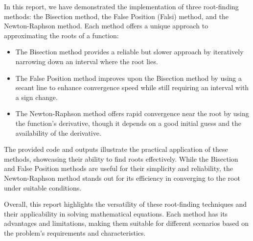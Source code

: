 \documentclass{scrreprt}
\begin{document}
In this report, we have demonstrated the implementation of three root-finding methods: the Bisection method, the False Position (Falsi) method, and the Newton-Raphson method. Each method offers a unique approach to approximating the roots of a function:

\begin{itemize}
    \item The Bisection method provides a reliable but slower approach by iteratively narrowing down an interval where the root lies.
    \item The False Position method improves upon the Bisection method by using a secant line to enhance convergence speed while still requiring an interval with a sign change.
    \item The Newton-Raphson method offers rapid convergence near the root by using the function's derivative, though it depends on a good initial guess and the availability of the derivative.
\end{itemize}

The provided code and outputs illustrate the practical application of these methods, showcasing their ability to find roots effectively. While the Bisection and False Position methods are useful for their simplicity and reliability, the Newton-Raphson method stands out for its efficiency in converging to the root under suitable conditions.

Overall, this report highlights the versatility of these root-finding techniques and their applicability in solving mathematical equations. Each method has its advantages and limitations, making them suitable for different scenarios based on the problem's requirements and characteristics.
\end{document}
